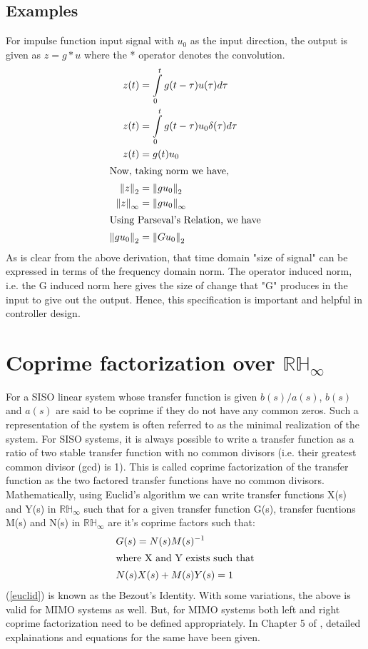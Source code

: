 \documentclass[a4paper,12pt]{article}
\newcommand\norm[1]{\left\lVert#1\right\rVert}
\begin{document}
	\subsection{Examples}
	For impulse function input signal with $u_{0}$ as the input direction, the output is given as $z=g*u$ where the * operator denotes the convolution. 
	\begin{align*}
		z(t) &= \int\limits_{0}^t g(t-\tau)u(\tau)d\tau\\
		z(t) &= \int\limits_{0}^t g(t-\tau)u_{0}\delta(\tau)d\tau\\
		z(t) &= g(t)u_{0}\\
		\intertext{Now, taking norm we have,}
		\norm{z}_{2} &= \norm{gu_{0}}_{2}\\
		\norm{z}_{\infty} &= \norm{gu_{0}}_{\infty}\\
		\intertext{Using Parseval's Relation, we have}
		\norm{gu_{0}}_{2} &= \norm{Gu_{0}}_{2}\\
	\end{align*}
	As is clear from the above derivation, that time domain "size of signal" can be expressed in terms of the frequency domain norm. The operator induced norm, i.e. the G induced norm here gives the size of change that "G" produces in the input to give out the output. Hence, this specification is important and helpful in controller design.
	\section{Coprime factorization over $\mathbb{RH_{\infty}}$} For a SISO linear system whose transfer function is given $b(s)/a(s)$, $b(s)$ and $a(s)$ are said to be coprime if they do not have any common zeros. Such a representation of the system is often referred to as the minimal realization of the system. For SISO systems, it is always possible to write a transfer function as a ratio of two stable transfer function with no common divisors (i.e. their greatest common divisor (gcd) is 1). This is called coprime factorization of the transfer function as the two factored transfer functions have no common divisors. Mathematically, using Euclid's algorithm we can write transfer functions X(s) and Y(s) in $\mathbb{RH_{\infty}}$ such that for a given transfer function G(s), transfer fucntions M(s) and N(s) in $\mathbb{RH_{\infty}}$ are it's coprime factors such that:
	\begin{align}
		&G(s) = N(s)M(s)^{-1}\\
		\intertext{where X and Y exists such that}
		&N(s)X(s)+M(s)Y(s)=1
		\label{euclid}
	\end{align}
	(\ref{euclid}) is known as the Bezout's Identity. With some variations, the above is valid for MIMO systems as well. But, for MIMO systems both left and right coprime factorization need to be defined appropriately. In Chapter 5 of \cite{book}, detailed explainations and equations for the same have been given.
\end{document}
